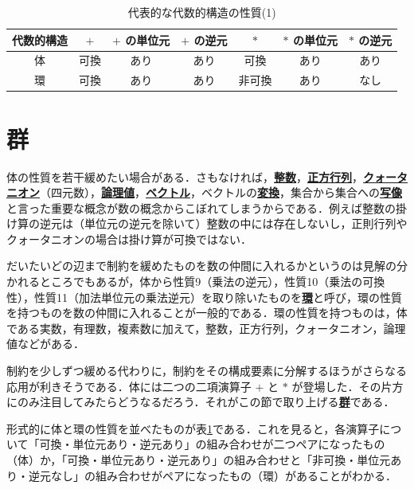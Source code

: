 \documentclass[a4paper,twocolumn]{jsbook}
\newcommand{\keyword}[1]{{\underline{\textbf{#1}}}}
\begin{document}
\begin{table}
\caption{代表的な代数的構造の性質(1)}
\label{tab:field-and-ring}
\begin{center}
\begin{tabular}{||c||c|c|c|c|c|c||}
\hline
代数的構造&$+$&$+$ の単位元&$+$ の逆元&$*$&$*$ の単位元&$*$ の逆元\\
\hline\hline
体&可換&あり&あり&可換&あり&あり\\
環&可換&あり&あり&非可換&あり&なし\\
\hline
\end{tabular}
\end{center}
\end{table}

\section{群}

体の性質を若干緩めたい場合がある．さもなければ，\keyword{整数}，\keyword{正方行列}，\keyword{クォータニオン}（四元数），\keyword{論理値}，\keyword{ベクトル}，ベクトルの\keyword{変換}，集合から集合への\keyword{写像}と言った重要な概念が数の概念からこぼれてしまうからである．例えば整数の掛け算の逆元は（単位元の逆元を除いて）整数の中には存在しないし，正則行列やクォータニオンの場合は掛け算が可換ではない．

だいたいどの辺まで制約を緩めたものを数の仲間に入れるかというのは見解の分かれるところでもあるが，体から性質9（乗法の逆元），性質10（乗法の可換性），性質11（加法単位元の乗法逆元）を取り除いたものを\keyword{環}と呼び，環の性質を持つものを数の仲間に入れることが一般的である．環の性質を持つものは，体である実数，有理数，複素数に加えて，整数，正方行列，クォータニオン，論理値などがある．

制約を少しずつ緩める代わりに，制約をその構成要素に分解するほうがさらなる応用が利きそうである．体には二つの二項演算子 $+$ と $*$ が登場した．その片方にのみ注目してみたらどうなるだろう．それがこの節で取り上げる\keyword{群}である．

形式的に体と環の性質を並べたものが表\ref{tab:field-and-ring}である．これを見ると，各演算子について「可換・単位元あり・逆元あり」の組み合わせが二つペアになったもの（体）か，「可換・単位元あり・逆元あり」の組み合わせと「非可換・単位元あり・逆元なし」の組み合わせがペアになったもの（環）があることがわかる．
\end{document}
